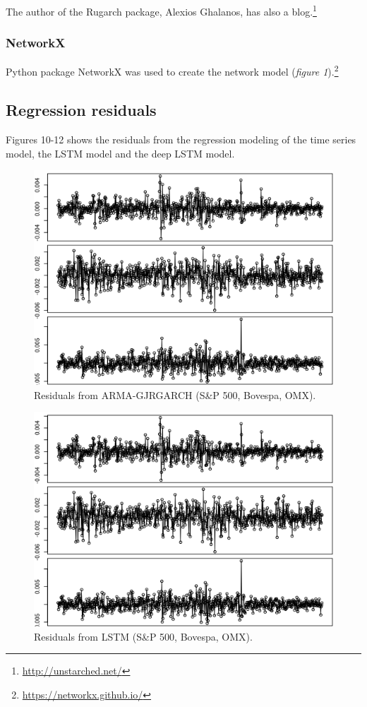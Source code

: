 \documentclass[12pt, letterpaper]{amsart}%
\begin{document}
The author of the Rugarch package, Alexios Ghalanos, has also a blog.\footnote{\url{http://unstarched.net/}}

\subsubsection{NetworkX}
Python package NetworkX was used to create the network model (\textit{figure 1}).\footnote{\url{https://networkx.github.io/}}

\subsection{Regression residuals}
Figures 10-12 shows the residuals from the regression modeling of the time series model, the LSTM model and the deep LSTM model.


\begin{figure}
\caption{Residuals from ARMA-GJRGARCH (S\&P 500, Bovespa, OMX).}
\centering
\includegraphics[scale=0.8]{garch_resid.png}
\end{figure}

\begin{figure}[H]
\caption{Residuals from LSTM (S\&P 500, Bovespa, OMX).}
\centering
\includegraphics[scale=0.8]{lstm_resid.png}
\end{figure}
\end{document}
